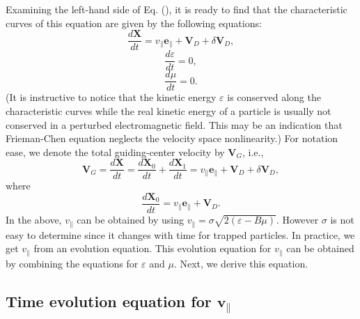 \documentclass{llncs}
\begin{document}
Examining the left-hand side of Eq. (), it is ready to find that the
characteristic curves of this equation are given by the following equations:
\begin{equation}
  \label{16-10-11-3} \frac{d\mathbf{X}}{d t} = v_{\parallel}
  \mathbf{e}_{\parallel} +\mathbf{V}_D + \delta \mathbf{V}_D,
\end{equation}
\begin{equation}
  \label{16-10-12-1} \frac{d \varepsilon}{d t} = 0,
\end{equation}
\begin{equation}
  \label{16-10-12-2} \frac{d \mu}{d t} = 0.
\end{equation}
(It is instructive to notice that the kinetic energy $\varepsilon$ is
conserved along the characteristic curves while the real kinetic energy of a
particle is usually not conserved in a perturbed electromagnetic field. This
may be an indication that Frieman-Chen equation neglects the velocity space
nonlinearity.) For notation ease, we denote the total guiding-center velocity
by $\mathbf{V}_G$, i.e.,
\begin{equation}
  \mathbf{V}_G = \frac{d\mathbf{X}}{d t} = \frac{d\mathbf{X}_0}{d t} +
  \frac{d\mathbf{X}_1}{d t} = v_{\parallel} \mathbf{e}_{\parallel}
  +\mathbf{V}_D + \delta \mathbf{V}_D,
\end{equation}
where
\begin{equation}
  \frac{d\mathbf{X}_0}{d t} = v_{\parallel} \mathbf{e}_{\parallel}
  +\mathbf{V}_D .
\end{equation}
In the above, $v_{\parallel}$ can be obtained by using $v_{\parallel} = \sigma
\sqrt{2 (\varepsilon - B \mu)}$. However $\sigma$ is not easy to determine
since it changes with time for trapped particles. In practice, we get
$v_{\parallel}$ from an evolution equation. This evolution equation for
$v_{\parallel}$ can be obtained by combining the equations for $\varepsilon$
and $\mu$. Next, we derive this equation.

\subsection{Time evolution equation for $\mathbf{v}_{\parallel}$}
\end{document}

